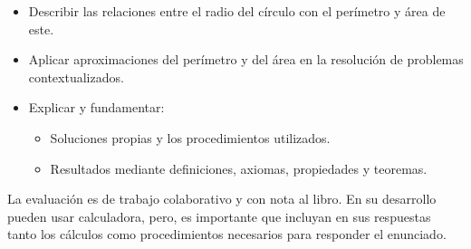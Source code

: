 \documentclass{DivinaPastora}
\begin{document}
%
\begin{tcenter}%
\end{tcenter}%

\begin{itemize}[nosep]
    \item Describir las relaciones entre el radio del círculo con el perímetro y área de este.
    \item Aplicar aproximaciones del perímetro y del área en la resolución de problemas contextualizados.
    \item Explicar y fundamentar:
    \begin{itemize}[label=\textbullet]
        \item Soluciones propias y los procedimientos utilizados.
        \item Resultados mediante definiciones, axiomas, propiedades y teoremas.
    \end{itemize}
\end{itemize}

La evaluación es de trabajo colaborativo y con nota al libro.
En su desarrollo pueden usar calculadora, pero, es importante
que incluyan en sus respuestas tanto los cálculos como procedimientos
necesarios para responder el enunciado.
\end{document}
